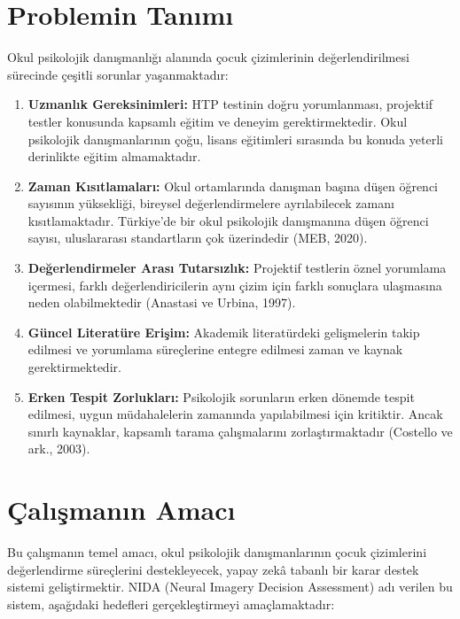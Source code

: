 \section{Problemin Tanımı}

Okul psikolojik danışmanlığı alanında çocuk çizimlerinin değerlendirilmesi sürecinde çeşitli sorunlar yaşanmaktadır:

\begin{enumerate}
  \item \textbf{Uzmanlık Gereksinimleri:} HTP testinin doğru yorumlanması, projektif testler konusunda kapsamlı eğitim ve deneyim gerektirmektedir. Okul psikolojik danışmanlarının çoğu, lisans eğitimleri sırasında bu konuda yeterli derinlikte eğitim almamaktadır.

  \item \textbf{Zaman Kısıtlamaları:} Okul ortamlarında danışman başına düşen öğrenci sayısının yüksekliği, bireysel değerlendirmelere ayrılabilecek zamanı kısıtlamaktadır. Türkiye'de bir okul psikolojik danışmanına düşen öğrenci sayısı, uluslararası standartların çok üzerindedir (MEB, 2020).

  \item \textbf{Değerlendirmeler Arası Tutarsızlık:} Projektif testlerin öznel yorumlama içermesi, farklı değerlendiricilerin aynı çizim için farklı sonuçlara ulaşmasına neden olabilmektedir (Anastasi ve Urbina, 1997).

  \item \textbf{Güncel Literatüre Erişim:} Akademik literatürdeki gelişmelerin takip edilmesi ve yorumlama süreçlerine entegre edilmesi zaman ve kaynak gerektirmektedir.

  \item \textbf{Erken Tespit Zorlukları:} Psikolojik sorunların erken dönemde tespit edilmesi, uygun müdahalelerin zamanında yapılabilmesi için kritiktir. Ancak sınırlı kaynaklar, kapsamlı tarama çalışmalarını zorlaştırmaktadır (Costello ve ark., 2003).
\end{enumerate}

\section{Çalışmanın Amacı}

Bu çalışmanın temel amacı, okul psikolojik danışmanlarının çocuk çizimlerini değerlendirme süreçlerini destekleyecek, yapay zekâ tabanlı bir karar destek sistemi geliştirmektir. NIDA (Neural Imagery Decision Assessment) adı verilen bu sistem, aşağıdaki hedefleri gerçekleştirmeyi amaçlamaktadır:

